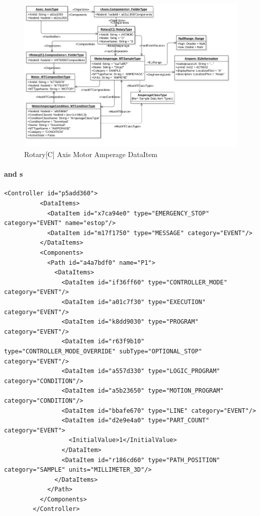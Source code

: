 \begin{figure}[ht]
    \centering
    \includegraphics[width=1.0\textwidth]{diagrams/mtconnect-mapping/rotary-c-amperage.png}
    \caption{Rotary[C] Axis Motor Amperage DataItem}
    \label{fig:rotary-c-amperage}
\end{figure}

\FloatBarrier

\paragraph{ and  s}

\begin{lstlisting}[firstnumber=last,%
    caption={Controller and Path Components and Their Data Items},label={lst:controller-component}]
        <Controller id="p5add360">
          <DataItems>
            <DataItem id="x7ca94e0" type="EMERGENCY_STOP" category="EVENT" name="estop"/>
            <DataItem id="m17f1750" type="MESSAGE" category="EVENT"/>
          </DataItems>
          <Components>
            <Path id="a4a7bdf0" name="P1">
              <DataItems>
                <DataItem id="if36ff60" type="CONTROLLER_MODE" category="EVENT"/>
                <DataItem id="a01c7f30" type="EXECUTION" category="EVENT"/>
                <DataItem id="k8dd9030" type="PROGRAM" category="EVENT"/>
                <DataItem id="r63f9b10" type="CONTROLLER_MODE_OVERRIDE" subType="OPTIONAL_STOP" category="EVENT"/>
                <DataItem id="a557d330" type="LOGIC_PROGRAM" category="CONDITION"/>
                <DataItem id="a5b23650" type="MOTION_PROGRAM" category="CONDITION"/>
                <DataItem id="bbafe670" type="LINE" category="EVENT"/>
                <DataItem id="d2e9e4a0" type="PART_COUNT" category="EVENT">
                  <InitialValue>1</InitialValue>
                </DataItem>
                <DataItem id="r186cd60" type="PATH_POSITION" category="SAMPLE" units="MILLIMETER_3D"/>
              </DataItems>
            </Path>
          </Components>
        </Controller>
\end{lstlisting}

